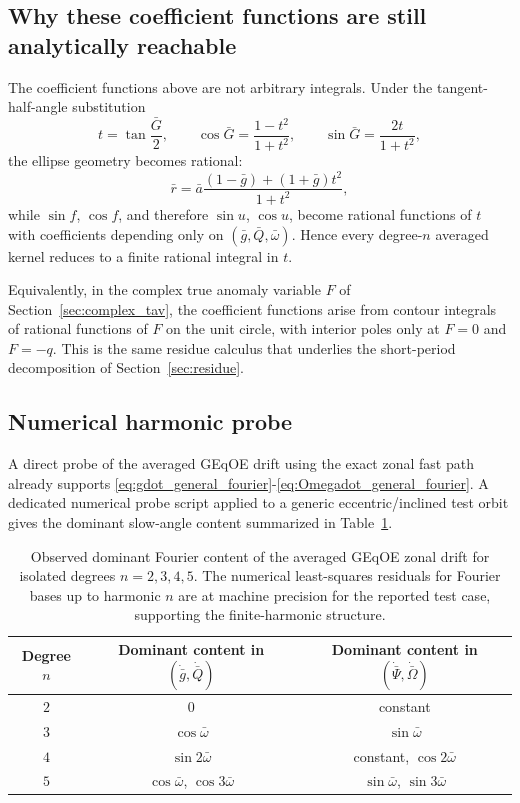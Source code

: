 \documentclass[11pt]{article}
\begin{document}
\subsection{Why these coefficient functions are still analytically reachable}

The coefficient functions above are not arbitrary integrals. Under the
tangent-half-angle substitution
\begin{equation}
t = \tan\frac{\bar G}{2},
\qquad
\cos\bar G = \frac{1-t^2}{1+t^2},
\qquad
\sin\bar G = \frac{2t}{1+t^2},
\end{equation}
the ellipse geometry becomes rational:
\begin{equation}
\bar r
= \bar a\frac{(1-\bar g)+(1+\bar g)t^2}{1+t^2},
\end{equation}
while $\sin f$, $\cos f$, and therefore $\sin u$, $\cos u$, become rational
functions of $t$ with coefficients depending only on
$(\bar g,\bar Q,\bar\omega)$. Hence every degree-$n$ averaged kernel reduces to
a finite rational integral in $t$.

Equivalently, in the complex true anomaly variable $F$ of
Section~\ref{sec:complex_tav}, the coefficient functions arise from contour
integrals of rational functions of $F$ on the unit circle, with interior
poles only at $F = 0$ and $F = -q$. This is the same
residue calculus that underlies the short-period decomposition of
Section~\ref{sec:residue}.

\subsection{Numerical harmonic probe}

A direct probe of the averaged GEqOE drift using the exact zonal fast path
already supports \eqref{eq:gdot_general_fourier}-\eqref{eq:Omegadot_general_fourier}.
A dedicated numerical probe script applied to a generic
eccentric/inclined test orbit gives the dominant slow-angle content summarized in
Table~\ref{tab:zonal_harmonic_probe}.

\begin{table}[ht]
\centering
\begin{tabular}{@{}ccc@{}}
\toprule
Degree $n$ & Dominant content in $(\dot{\bar g},\dot{\bar Q})$ & Dominant content in $(\dot{\bar\Psi},\dot{\bar\Omega})$ \\
\midrule
$2$ & $0$ & constant \\
$3$ & $\cos\bar\omega$ & $\sin\bar\omega$ \\
$4$ & $\sin 2\bar\omega$ & constant, $\cos 2\bar\omega$ \\
$5$ & $\cos\bar\omega$, $\cos 3\bar\omega$ & $\sin\bar\omega$, $\sin 3\bar\omega$ \\
\bottomrule
\end{tabular}
\caption{Observed dominant Fourier content of the averaged GEqOE zonal drift for isolated degrees $n=2,3,4,5$. The numerical least-squares residuals for Fourier bases up to harmonic $n$ are at machine precision for the reported test case, supporting the finite-harmonic structure.}
\label{tab:zonal_harmonic_probe}
\end{table}
\end{document}

